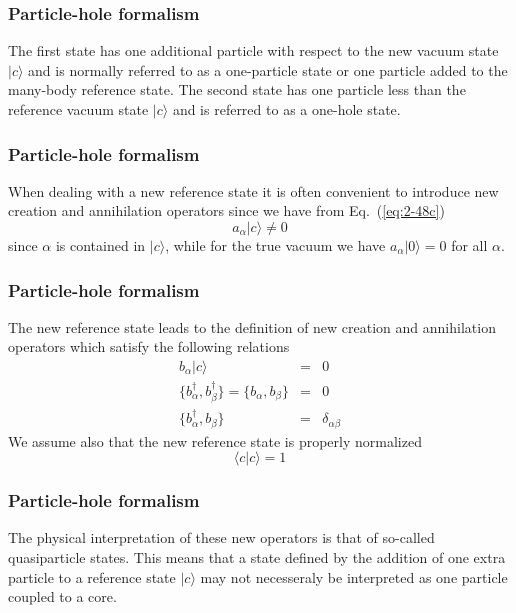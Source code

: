 \documentclass[compress]{beamer}
\newcommand*{\ket}[1]{|#1\rangle}
\begin{document}
\frame
{
  \frametitle{Particle-hole formalism}
\begin{small}
{\scriptsize
The first state has one additional particle with respect to the new vacuum state
$\ket{c}$  and is normally referred to as a one-particle state or one particle added to the 
many-body reference state. 
The second state has one particle less than the reference vacuum state  $\ket{c}$ and is referred to as
a one-hole state. 
}
\end{small}
}

\frame
{
  \frametitle{Particle-hole formalism}
\begin{small}
{\scriptsize
When dealing with a new reference state it is often convenient to introduce 
new creation and annihilation operators since we have 
from Eq.~(\ref{eq:2-48c})
\begin{equation}
	a_\alpha \ket{c} \neq 0 \label{eq:2-49}
\end{equation}
since  $\alpha$ is contained  in $\ket{c}$, while for the true vacuum we have 
$a_\alpha \ket{0} = 0$ for all $\alpha$.
}
\end{small}
}


\frame
{
  \frametitle{Particle-hole formalism}
\begin{small}
{\scriptsize
The new reference state leads to the definition of new creation and annihilation operators
which satisfy the following relations
\begin{eqnarray}
	b_\alpha \ket{c} &=& 0 \label{eq:2-50a} \\
	\{b_\alpha^\dagger , b_\beta^\dagger \} = \{b_\alpha , b_\beta \} &=& 0 \nonumber  \\
	\{b_\alpha^\dagger , b_\beta \} &=& \delta_{\alpha \beta} \label{eq:2-50c}
\end{eqnarray}
We assume also that the new reference state is properly normalized
\begin{equation}
	\langle c | c \rangle = 1 \label{eq:2-51}
\end{equation}
}
\end{small}
}


\frame
{
  \frametitle{Particle-hole formalism}
\begin{small}
{\scriptsize
The physical interpretation of these new operators is that of so-called quasiparticle states.
This means that a state defined by the addition of one extra particle to a reference state 
$\ket{c}$ may not necesseraly be interpreted as one particle coupled to a core.
}
\end{small}
}
\end{document}

